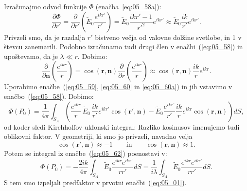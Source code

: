Izračunajmo odvod funkcije $\Phi$ (enačba~\ref{eq:05_58a}):
\begin{equation}
\frac{\partial \Phi}{\partial r'} = \frac{\partial}{\partial r'}\left(\tilde{E}_0\frac{e^{ikr'}}{r'}\right) = 
\tilde{E}_0\frac{ikr'-1}{r'^2}e^{ikr'} \approx \tilde{E}_0\frac{ik}{r'}e^{ikr'}.
\label{eq:05_60}
\end{equation}
Privzeli smo, da je razdalja $r'$ bistveno večja od valovne dolžine svetlobe, in 1 v števcu zanemarili. 
Podobno izračunamo tudi drugi člen v enačbi~(\ref{eq:05_58}) in upoštevamo, da je $\lambda \ll r$. Dobimo:
\begin{equation}
\frac{\partial}{\partial \mathbf{n}}\left( \frac{e^{ikr}}{r} \right) = 
\cos\left(\mathbf{r},\mathbf{n}\right) \frac{\partial}{\partial r} \left( \frac{e^{ikr}}{r} \right) \approx
\cos\left(\mathbf{r},\mathbf{n}\right) \frac{ik}{r}e^{ikr}.
\label{eq:05_60a}
\end{equation}
Uporabimo enačbe~(\ref{eq:05_59}, \ref{eq:05_60} in \ref{eq:05_60a}) in jih vstavimo v enačbo~(\ref{eq:05_58}). Dobimo:
\begin{equation}
\Phi(P_0) = \frac{1}{4\pi} \int_{S_A} \left( \frac{e^{ikr}}{r}\,\tilde{E}_0\, \frac{ik}{r'}e^{ikr'} \cos\left(\mathbf{r'},\mathbf{n}\right)-\tilde{E}_0
\frac{e^{ikr'}}{r'} \frac{ik}{r}e^{ikr} \cos\left(\mathbf{r},\mathbf{n}\right)  \right) dS,
\label{eq:05_61}
\end{equation}
od koder sledi Kirchhoffov uklonski integral:
Razliko kosinusov imenujemo tudi oblikovni faktor. V geometriji, ki smo jo privzeli, navadno velja
\begin{equation}
\cos\left(\mathbf{r'},\mathbf{n}\right) \approx -1 \qquad \mathrm{in} \qquad \cos\left(\mathbf{r},\mathbf{n}\right) \approx 1.
\label{eq:05_63}
\end{equation}
Potem se integral iz enačbe~(\ref{eq:05_62}) poenostavi v:
\begin{equation}
\Phi(P_0) = - \frac{2ik}{4\pi} \int_{S_A} \tilde{E}_0 \frac{e^{ikr}e^{ikr'}}{rr'} dS = 
\frac{1}{i\lambda} \int_{S_A}\tilde{E}_0 \frac{e^{ikr}e^{ikr'}}{rr'} dS.
\label{eq:05_64}
\end{equation}
S tem smo izpeljali predfaktor v prvotni enačbi~(\ref{eq:05_01}).

